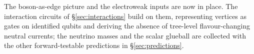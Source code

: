 The boson-as-edge picture and the electroweak inputs are now in place. The interaction circuits of
\S\ref{sec:interactions} build on them, representing vertices as gates on identified qubits and
deriving the absence of tree-level flavour-changing neutral currents; the neutrino masses and the
scalar glueball are collected with the other forward-testable predictions in \S\ref{sec:predictions}.
